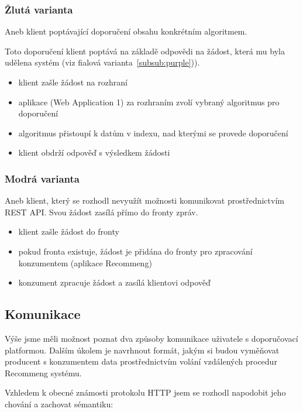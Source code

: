 \documentclass[thesis=M,czech]{FITthesis}[2014/05/07]
\begin{document}
\subsubsection{Žlutá varianta}
\label{subsub:yellow}

Aneb klient poptávající doporučení obsahu konkrétním algoritmem.

Toto doporučení klient poptává na základě odpovědi na žádost, která mu byla udělena systém (viz fialová varianta~\ref{subsub:purple})). 

\begin{itemize}
	\item klient zašle žádost na rozhraní
	\item aplikace (Web Application 1) za rozhraním zvolí vybraný algoritmus pro doporučení
	\item algoritmus přistoupí k datům v indexu, nad kterými se provede doporučení
	\item klient obdrží odpověď s výsledkem žádosti
\end{itemize}

\subsubsection{Modrá varianta}

Aneb klient, který se rozhodl nevyužít možnosti komunikovat prostřednictvím REST API. Svou žádost zasílá přímo do fronty zpráv.

\begin{itemize}
	\item klient zašle žádost do fronty
	\item pokud fronta existuje, žádost je přidána do fronty pro zpracování konzumentem (aplikace Recommeng)
	\item konzument zpracuje žádost a zasílá klientovi odpověď
\end{itemize}

\subsection{Komunikace}

Výše jsme měli možnost poznat dva způsoby komunikace uživatele s doporučovací platformou. Dalším úkolem je navrhnout formát, jakým si budou vyměňovat producent s konzumentem data prostřednictvím volání vzdálených procedur Recommeng systému.

Vzhledem k obecné známosti protokolu HTTP jsem se rozhodl napodobit jeho chování a zachovat sémantiku:
\end{document}
